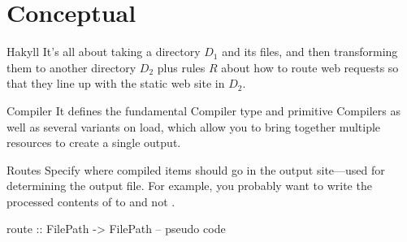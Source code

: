 \documentclass[openany, 12pt]{article}
\begin{document}
\maketitle{}


\section{Conceptual}
\begin{intuition}{Hakyll}{}
	It's all about taking a directory $D_1$ and its files, and then
	transforming them to another directory $D_2$ plus rules $R$ about how to
	route web requests so that they line up with the static web site in $D_2$.
\end{intuition}

\begin{definition}{Compiler}{}
	It defines the fundamental Compiler type and primitive Compilers as well as
	several variants on load, which allow you to bring together multiple
	resources to create a single output.
\end{definition}

\begin{definition}{Routes}{}
	Specify where compiled items should go in the output site---used for
	determining the output file. For example, you probably want to write the
	processed contents of  to 
	and not .
	\begin{haskell}{}
route :: FilePath -> FilePath -- pseudo code
\end{haskell}
\end{definition}
\end{document}
